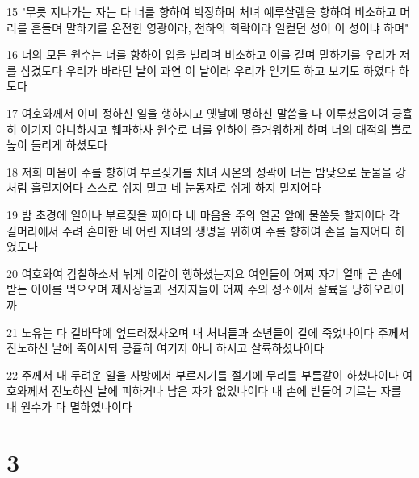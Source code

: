 \par 15 "무릇 지나가는 자는 다 너를 향하여 박장하며 처녀 예루살렘을 향하여 비소하고 머리를 흔들며 말하기를 온전한 영광이라, 천하의 희락이라 일컫던 성이 이 성이냐 하며"
\par 16 너의 모든 원수는 너를 향하여 입을 벌리며 비소하고 이를 갈며 말하기를 우리가 저를 삼켰도다 우리가 바라던 날이 과연 이 날이라 우리가 얻기도 하고 보기도 하였다 하도다
\par 17 여호와께서 이미 정하신 일을 행하시고 옛날에 명하신 말씀을 다 이루셨음이여 긍휼히 여기지 아니하시고 훼파하사 원수로 너를 인하여 즐거워하게 하며 너의 대적의 뿔로 높이 들리게 하셨도다
\par 18 저희 마음이 주를 향하여 부르짖기를 처녀 시온의 성곽아 너는 밤낮으로 눈물을 강처럼 흘릴지어다 스스로 쉬지 말고 네 눈동자로 쉬게 하지 말지어다
\par 19 밤 초경에 일어나 부르짖을 찌어다 네 마음을 주의 얼굴 앞에 물쏟듯 할지어다 각 길머리에서 주려 혼미한 네 어린 자녀의 생명을 위하여 주를 향하여 손을 들지어다 하였도다
\par 20 여호와여 감찰하소서 뉘게 이같이 행하셨는지요 여인들이 어찌 자기 열매 곧 손에 받든 아이를 먹으오며 제사장들과 선지자들이 어찌 주의 성소에서 살륙을 당하오리이까
\par 21 노유는 다 길바닥에 엎드러졌사오며 내 처녀들과 소년들이 칼에 죽었나이다 주께서 진노하신 날에 죽이시되 긍휼히 여기지 아니 하시고 살륙하셨나이다
\par 22 주께서 내 두려운 일을 사방에서 부르시기를 절기에 무리를 부름같이 하셨나이다 여호와께서 진노하신 날에 피하거나 남은 자가 없었나이다 내 손에 받들어 기르는 자를 내 원수가 다 멸하였나이다

\chapter{3}

